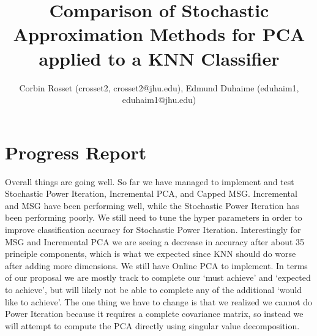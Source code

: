 \documentclass[11pt]{article}
\title{Comparison of Stochastic Approximation Methods for PCA applied to a KNN Classifier}
\author{Corbin Rosset (crosset2, crosset2@jhu.edu), Edmund Duhaime (eduhaim1, eduhaim1@jhu.edu)}
\date{}
\begin{document}
\maketitle

\section{Progress Report}

Overall things are going well. So far we have managed to implement and test Stochastic Power Iteration, Incremental PCA, and Capped MSG. Incremental and MSG have been performing well, while the Stochastic Power Iteration has been performing poorly. We still need to tune the hyper parameters in order to improve classification accuracy for Stochastic Power Iteration. Interestingly for MSG and Incremental PCA we are seeing a decrease in accuracy after about 35 principle components, which is what we expected since KNN should do worse after adding more dimensions. We still have Online PCA to implement. In terms of our proposal we are mostly track to complete our `must achieve' and `expected to achieve', but will likely not be able to complete any of the additional `would like to achieve'. The one thing we have to change is that we realized we cannot do Power Iteration because it requires a complete covariance matrix, so instead we will attempt to compute the PCA directly using singular value decomposition. 
\end{document}
